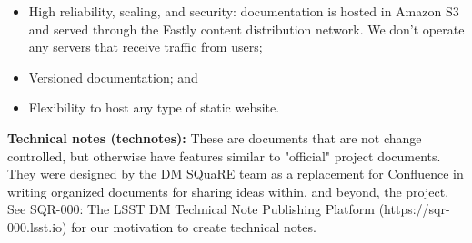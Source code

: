 \begin{itemize}
	\item High reliability, scaling, and security: documentation is hosted in Amazon S3 and served through the Fastly content distribution network. We don't operate any servers that receive traffic from users;
	\item Versioned documentation; and
	\item Flexibility to host any type of static website.
\end{itemize}

{\bf Technical notes (technotes):}  These are documents that are not change controlled, but otherwise have features similar to "official" project documents. They were designed by the DM SQuaRE team as a replacement for Confluence in writing organized documents for sharing ideas within, and beyond, the project. See SQR-000: The LSST DM Technical Note Publishing Platform (https://sqr-000.lsst.io) for our motivation to create technical notes. 
